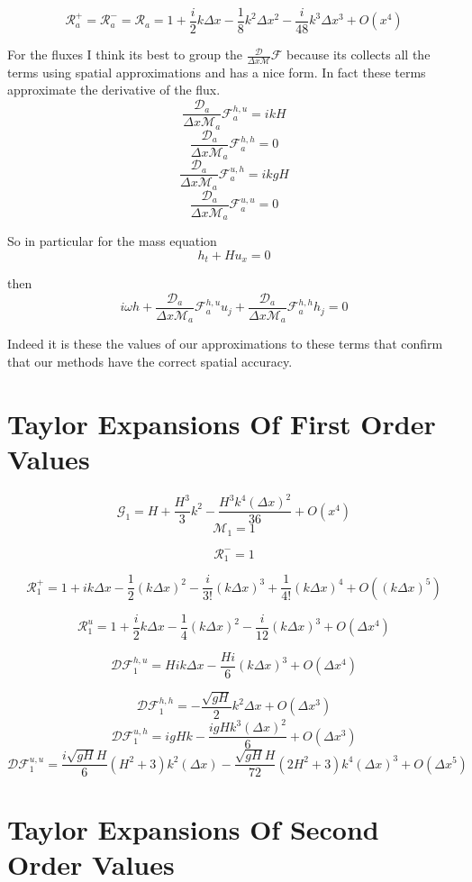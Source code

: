 \documentclass[12pt]{article}
\begin{document}
\[\mathcal{R}_a^+ = \mathcal{R}_a^-=\mathcal{R}_a = 1 + \frac{i}{2}k\Delta x   - \frac{1}{8}k^2\Delta x^2 - \frac{i}{48}k^3\Delta x^3 + O(x^{4})\]


For the fluxes I think its best to group the $ \frac{\mathcal{D}}{\Delta x\mathcal{M}}\mathcal{F}$ because its collects all the terms using spatial approximations and has a nice form. In fact these terms approximate the derivative of the flux.
\[\frac{\mathcal{D}_a}{\Delta x\mathcal{M}_a}\mathcal{F}^{h,u}_a = ikH\]
\[\frac{\mathcal{D}_a}{\Delta x\mathcal{M}_a}\mathcal{F}^{h,h}_a = 0\]
\[\frac{\mathcal{D}_a}{\Delta x\mathcal{M}_a}\mathcal{F}^{u,h}_a = ikgH\]
\[\frac{\mathcal{D}_a}{\Delta x\mathcal{M}_a}\mathcal{F}^{u,u}_a = 0\]

So in particular for the mass equation
\[h_t + Hu_x = 0\]

then
\[ i \omega h + \frac{\mathcal{D}_a}{\Delta x\mathcal{M}_a}\mathcal{F}^{h,u}_a u_j + \frac{\mathcal{D}_a}{\Delta x\mathcal{M}_a}\mathcal{F}^{h,h}_a h_j = 0  \]

Indeed it is these the values of our approximations to these terms that confirm that our methods have the correct spatial accuracy.

\section{Taylor Expansions Of First Order Values }

\[\mathcal{G}_1 = H +\frac{H^3}{3} k^2 -\frac{H^3 k^4(\Delta x)^2}{36} + O(x^{4})\]
\[\mathcal{M}_1 = 1\]

\[\mathcal{R}^-_1 =  1\]

\[\mathcal{R}^+_1 = 1 + i k\Delta x  - \frac{1}{2} (k\Delta x)^2 - \frac{i}{3!} (k\Delta x)^3 + \frac{1}{4!} (k\Delta x)^4 +  O((k\Delta x)^5)\]

\[\mathcal{R}^u_1 = 1 + \frac{i}{2}k\Delta x - \frac{1}{4} (k \Delta x)^2 - \frac{i}{12} (k \Delta x)^3 +  O( \Delta x^4)\]

\[\mathcal{D}\mathcal{F}^{h,u}_1 = Hik\Delta x  - \frac{Hi}{6} (k \Delta x)^3 +  O( \Delta x^4) \]

\[\mathcal{D}\mathcal{F}^{h,h}_1 = -\frac{\sqrt{gH}}{ 2} k^2 \Delta x + O( \Delta x^3) \]
\[\mathcal{D}\mathcal{F}^{u,h}_1 = igHk -\frac{igHk^3(\Delta x)^2}{6} +  O( \Delta x^3) \]
\[\mathcal{D}\mathcal{F}^{u,u}_1 = \frac{i\sqrt{gH}H}{6}(H^2 + 3) k^2(\Delta x) - \frac{\sqrt{gH}H}{72}(2H^2 + 3)k^4 (\Delta x)^3 + O( \Delta x^5) \]


\section{Taylor Expansions Of Second Order Values }
\end{document}
